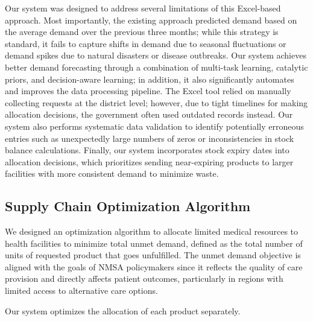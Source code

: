 \documentclass[12pt]{article}
\begin{document}
Our system was designed to address several limitations of this Excel-based approach. Most importantly, the existing approach predicted demand based on the average demand over the previous three months; while this strategy is standard, it fails to capture shifts in demand due to seasonal fluctuations or demand spikes due to natural disasters or disease outbreaks. Our system achieves better demand forecasting through a combination of multi-task learning, catalytic priors, and decision-aware learning; in addition, it also significantly automates and improves the data processing pipeline. The Excel tool relied on manually collecting requests at the district level; however, due to tight timelines for making allocation decisions, the government often used outdated records instead. Our system also performs systematic data validation to identify potentially erroneous entries such as unexpectedly large numbers of zeros or inconsistencies in stock balance calculations. Finally, our system incorporates stock expiry dates into allocation decisions, which prioritizes sending near-expiring products to larger facilities with more consistent demand to minimize waste.

\subsection{Supply Chain Optimization Algorithm}

We designed an optimization algorithm to allocate limited medical resources to health facilities to minimize total unmet demand, defined as the total number of units of requested product that goes unfulfilled. The unmet demand objective is aligned with the goals of NMSA policymakers since it reflects the quality of care provision and directly affects patient outcomes, particularly in regions with limited access to alternative care options.

Our system optimizes the allocation of each product separately.
\end{document}
